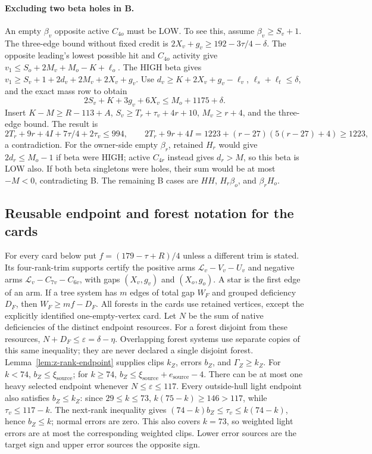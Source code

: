 \documentclass[11pt,letterpaper]{article}
\theoremstyle{definition}\newtheorem{definition}[theorem]{Definition}
\begin{document}
\paragraph{Excluding two beta holes in B.}
An empty $\beta_v$ opposite active $C_{4o}$ must be LOW. To see this, assume $\beta_v\ge S_v+1$. The three-edge bound without fixed credit is
$2X_v+g_v\ge192-3\tau/4-\delta$.
The opposite leading's lowest possible hit and $C_{4o}$ activity give
$v_1\le S_o+2M_v+M_o-K+\ell_o$.
The HIGH beta gives $v_1\ge S_v+1+2d_v+2M_v+2X_v+g_v$.
Use $d_v\ge K+2X_v+g_v-\ell_v$, $\ell_s+\ell_t\le\delta$, and the exact mass row to obtain
\[
 2S_v+K+3g_v+6X_v\le M_o+1175+\delta.
\]
Insert $K-M\ge R-113+A$, $S_v\ge T_r+\tau_v+4r+10$, $M_v\ge r+4$, and the three-edge bound. The result is
\[
 2T_r+9r+4I+7\tau/4+2\tau_v\le994,
 \qquad 2T_r+9r+4I=1223+(r-27)(5(r-27)+4)\ge1223,
\]
a contradiction. For the owner-side empty $\beta_r$, retained $H_r$ would give $2d_r\le M_o-1$ if beta were HIGH; active $C_{4r}$ instead gives $d_r>M$, so this beta is LOW also. If both beta singletons were holes, their sum would be at most $-M<0$, contradicting B.
The remaining B cases are $HH$, $H_r\beta_o$, and $\beta_rH_o$.

\subsection{Reusable endpoint and forest notation for the cards}
For every card below put $f=(179-\tau+R)/4$ unless a different trim is stated.
Its four-rank-trim supports certify the positive arms $\mathcal L_v-V_v-U_v$ and negative arms $\mathcal L_v-C_{7v}-C_{6v}$, with gaps $(X_v,g_v)$ and $(X_o,g_o)$. A star is the first edge of an arm. If a tree system has $m$ edges of total gap $W_F$ and grouped deficiency $D_F$, then $W_F\ge mf-D_F$. All forests in the cards use retained vertices, except the explicitly identified one-empty-vertex card.
Let $N$ be the sum of native deficiencies of the distinct endpoint resources. For a forest disjoint from these resources, $N+D_F\le\varepsilon=\delta-\eta$. Overlapping forest systems use separate copies of this same inequality; they are never declared a single disjoint forest.
Lemma~\ref{lem:z-rank-endpoint} supplies clips $k_Z$, errors $b_Z$, and $\Gamma_Z\ge k_Z$. For $k<74$, $b_Z\le\xi_{\mathrm{source}}$; for $k\ge74$, $b_Z\le\xi_{\mathrm{source}}+e_{\mathrm{source}}-4$. There can be at most one heavy selected endpoint whenever $N\le\varepsilon\le117$. Every outside-hull light endpoint also satisfies $b_Z\le k_Z$: since $29\le k\le73$, $k(75-k)\ge146>117$, while $\tau_v\le117-k$. The next-rank inequality gives $(74-k)b_Z\le\tau_v\le k(74-k)$, hence $b_Z\le k$; normal errors are zero. This also covers $k=73$, so weighted light errors are at most the corresponding weighted clips. Lower error sources are the target sign and upper error sources the opposite sign.
\end{document}
